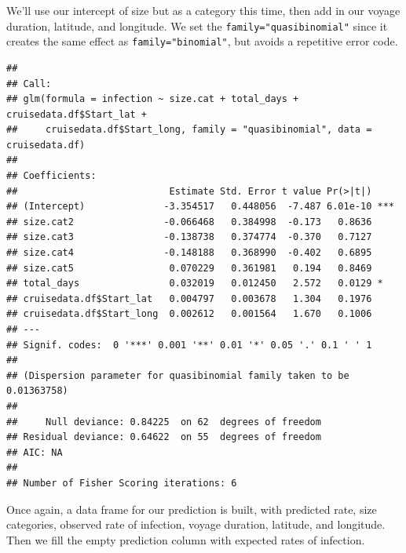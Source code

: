 \documentclass[
  11,
]{book}
\newenvironment{Shaded}{\begin{snugshade}}{\end{snugshade}}
\newcommand{\AttributeTok}[1]{\textcolor[rgb]{0.27,0.27,0.27}{#1}}
\newcommand{\FunctionTok}[1]{\textcolor[rgb]{0.27,0.27,0.27}{\textbf{#1}}}
\newcommand{\NormalTok}[1]{#1}
\newcommand{\OtherTok}[1]{\textcolor[rgb]{0.37,0.37,0.37}{#1}}
\newcommand{\SpecialCharTok}[1]{\textcolor[rgb]{0.43,0.43,0.43}{\textbf{#1}}}
\newcommand{\StringTok}[1]{\textcolor[rgb]{0.5,0.5,0.5}{#1}}
\begin{document}
We'll use our intercept of size but as a category this time, then add in our voyage duration, latitude, and longitude. We set the \texttt{family="quasibinomial"} since it creates the same effect as \texttt{family="binomial"}, but avoids a repetitive error code.

\begin{Shaded}
\end{Shaded}

\begin{verbatim}
## 
## Call:
## glm(formula = infection ~ size.cat + total_days + cruisedata.df$Start_lat + 
##     cruisedata.df$Start_long, family = "quasibinomial", data = cruisedata.df)
## 
## Coefficients:
##                           Estimate Std. Error t value Pr(>|t|)    
## (Intercept)              -3.354517   0.448056  -7.487 6.01e-10 ***
## size.cat2                -0.066468   0.384998  -0.173   0.8636    
## size.cat3                -0.138738   0.374774  -0.370   0.7127    
## size.cat4                -0.148188   0.368990  -0.402   0.6895    
## size.cat5                 0.070229   0.361981   0.194   0.8469    
## total_days                0.032019   0.012450   2.572   0.0129 *  
## cruisedata.df$Start_lat   0.004797   0.003678   1.304   0.1976    
## cruisedata.df$Start_long  0.002612   0.001564   1.670   0.1006    
## ---
## Signif. codes:  0 '***' 0.001 '**' 0.01 '*' 0.05 '.' 0.1 ' ' 1
## 
## (Dispersion parameter for quasibinomial family taken to be 0.01363758)
## 
##     Null deviance: 0.84225  on 62  degrees of freedom
## Residual deviance: 0.64622  on 55  degrees of freedom
## AIC: NA
## 
## Number of Fisher Scoring iterations: 6
\end{verbatim}

Once again, a data frame for our prediction is built, with predicted rate, size categories, observed rate of infection, voyage duration, latitude, and longitude. Then we fill the empty prediction column with expected rates of infection.
\end{document}
